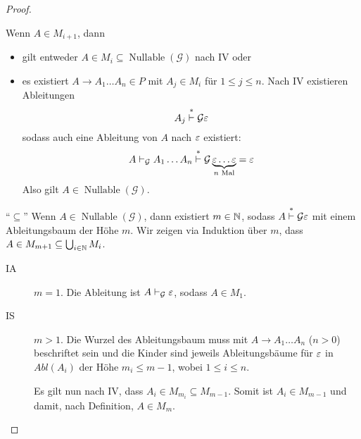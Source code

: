 \begin{proof}
\begin{description}
    Wenn $A \in M_{i+1}$, dann
    \begin{itemize}
    \item gilt entweder
      $A \in M_i \subseteq \operatorname{Nullable}(\mathcal{G})$ nach
      IV oder
    \item 
      es existiert $A \to A_1\ldots A_n \in P$ mit $A_j \in M_i$ für
      $1 \le j \le n$.
      Nach IV existieren Ableitungen
      \begin{displaymath}
        A_j \stackrel{*}{\vdash}\mathcal{G} \varepsilon
      \end{displaymath}
      sodass auch eine Ableitung von $A$ nach $\varepsilon$ existiert:
      \begin{displaymath}
        A  \vdash_\mathcal{G} A_1 \ldots A_n \stackrel{*}{\vdash}\mathcal{G} \underbrace{\varepsilon \ldots \varepsilon}_{n \text{ Mal}} = \varepsilon
      \end{displaymath}
      Also gilt $A \in \operatorname{Nullable}(\mathcal{G})$.
    \end{itemize}
  \end{description}

  \medskip
  
  "`$\subseteq$"'\quad
  Wenn $A \in \operatorname{Nullable}(\mathcal{G})$, dann existiert $m
  \in \mathbb{N}$, sodass $A \stackrel{*}{\vdash}\mathcal{G} \varepsilon$ mit einem
  Ableitungsbaum der Höhe $m$.
  Wir zeigen via Induktion über $m$, dass $A \in M_{m+1} \subseteq \bigcup_{i \in \mathbb{N}} M_i$.
  \begin{description}
  \item[IA] $m = 1$. Die Ableitung ist $A \vdash_\mathcal{G} \varepsilon$, sodass $A\in M_1$.
  \item[IS] $m > 1$.
    Die Wurzel des Ableitungsbaum muss mit $A \to A_1\ldots A_n$ ($n>0$)
    beschriftet sein und die Kinder sind jeweils Ableitungsbäume für
    $\varepsilon$ in  $Abl(A_i)$ der Höhe $m_i \le m-1$, wobei $1 \le i \le n$.
    
    Es gilt nun nach IV, dass $A_i \in M_{m_i} \subseteq M_{m-1}$.
    Somit ist $A_i \in M_{m-1}$ und damit, nach Definition, $A \in M_m$.
    \qedhere
  \end{description}
\end{proof}

